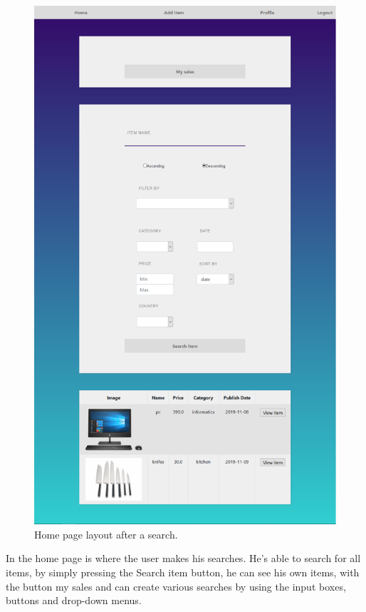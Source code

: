 \documentclass{article}
\begin{document}
\begin{figure}[H]
    \centering
    \includegraphics[scale=0.20]{homePage.png}
    \caption{Home page layout after a search.}
   \end{figure}

\qquad In the home page is where the user makes his searches. He's able to search for all items, by simply pressing the Search item button, he can see his own items, with the button my sales and can create various searches by using the input boxes, buttons and drop-down menus.
\end{document}
